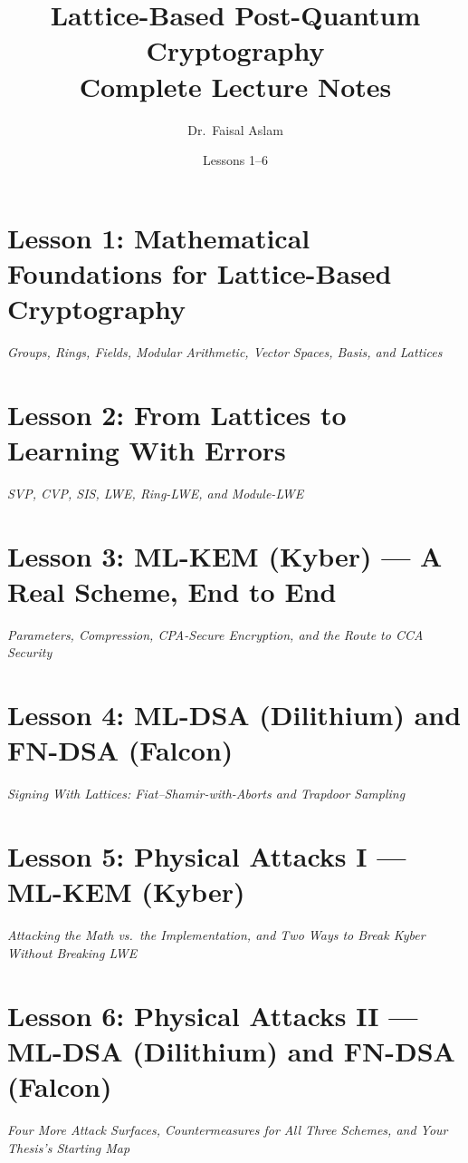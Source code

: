 \documentclass[11pt,a4paper,oneside]{book}
\title{\textbf{Lattice-Based Post-Quantum Cryptography}\\[6pt]
\large Complete Lecture Notes}
\author{Dr.\ Faisal Aslam}
\date{Lessons 1--6}
\begin{document}
\maketitle
\tableofcontents

\chapter{Lesson 1: Mathematical Foundations for Lattice-Based Cryptography}
\begin{center}
\large\itshape Groups, Rings, Fields, Modular Arithmetic, Vector Spaces, Basis, and Lattices
\end{center}
\vspace{0.4cm}


\chapter{Lesson 2: From Lattices to Learning With Errors}
\begin{center}
\large\itshape SVP, CVP, SIS, LWE, Ring-LWE, and Module-LWE
\end{center}
\vspace{0.4cm}


\chapter{Lesson 3: ML-KEM (Kyber) --- A Real Scheme, End to End}
\begin{center}
\large\itshape Parameters, Compression, CPA-Secure Encryption, and the Route to CCA Security
\end{center}
\vspace{0.4cm}


\chapter{Lesson 4: ML-DSA (Dilithium) and FN-DSA (Falcon)}
\begin{center}
\large\itshape Signing With Lattices: Fiat--Shamir-with-Aborts and Trapdoor Sampling
\end{center}
\vspace{0.4cm}


\chapter{Lesson 5: Physical Attacks I --- ML-KEM (Kyber)}
\begin{center}
\large\itshape Attacking the Math vs.\ the Implementation, and Two Ways to Break Kyber Without Breaking LWE
\end{center}
\vspace{0.4cm}


\chapter{Lesson 6: Physical Attacks II --- ML-DSA (Dilithium) and FN-DSA (Falcon)}
\begin{center}
\large\itshape Four More Attack Surfaces, Countermeasures for All Three Schemes, and Your Thesis's Starting Map
\end{center}
\vspace{0.4cm}

\end{document}

